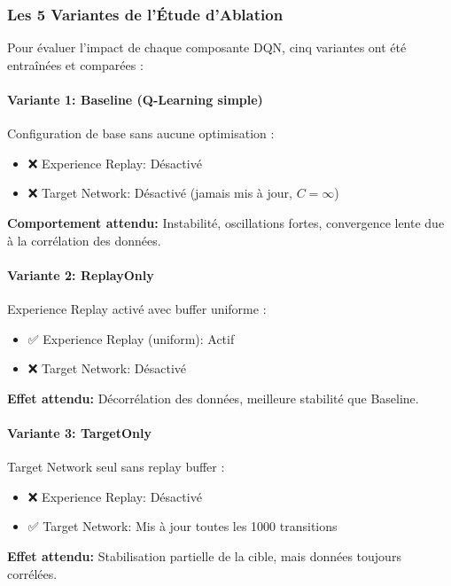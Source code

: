 \subsubsection{Les 5 Variantes de l'Étude d'Ablation}

Pour évaluer l'impact de chaque composante DQN, cinq variantes ont été entraînées et comparées :

\paragraph{Variante 1: Baseline (Q-Learning simple)}

Configuration de base sans aucune optimisation :
\begin{itemize}
    \item ❌ Experience Replay: Désactivé
    \item ❌ Target Network: Désactivé (jamais mis à jour, $C = \infty$)
\end{itemize}

\textbf{Comportement attendu:} Instabilité, oscillations fortes, convergence lente due à la corrélation des données.

\paragraph{Variante 2: ReplayOnly}

Experience Replay activé avec buffer uniforme :
\begin{itemize}
    \item ✅ Experience Replay (uniform): Actif
    \item ❌ Target Network: Désactivé
\end{itemize}

\textbf{Effet attendu:} Décorrélation des données, meilleure stabilité que Baseline.

\paragraph{Variante 3: TargetOnly}

Target Network seul sans replay buffer :
\begin{itemize}
    \item ❌ Experience Replay: Désactivé
    \item ✅ Target Network: Mis à jour toutes les 1000 transitions
\end{itemize}

\textbf{Effet attendu:} Stabilisation partielle de la cible, mais données toujours corrélées.

